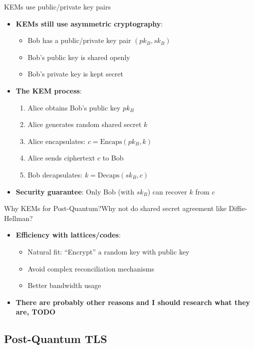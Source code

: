 \documentclass[aspectratio=169, lualatex, handout]{beamer}
\begin{document}
\begin{frame}{KEMs use public/private key pairs}
	\begin{itemize}
		\item \textbf{KEMs still use asymmetric cryptography}:
		      \begin{itemize}
			      \item Bob has a public/private key pair $(pk_B, sk_B)$
			      \item Bob's public key is shared openly
			      \item Bob's private key is kept secret
		      \end{itemize}
		\item \textbf{The KEM process}:
		      \begin{enumerate}
			      \item Alice obtains Bob's public key $pk_B$
			      \item Alice generates random shared secret $k$
			      \item Alice encapsulates: $c = \text{Encaps}(pk_B, k)$
			      \item Alice sends ciphertext $c$ to Bob
			      \item Bob decapsulates: $k = \text{Decaps}(sk_B, c)$
		      \end{enumerate}
		\item \textbf{Security guarantee}: Only Bob (with $sk_B$) can recover $k$ from $c$
	\end{itemize}
\end{frame}

\begin{frame}{Why KEMs for Post-Quantum?}{Why not do shared secret agreement like Diffie-Hellman?}
	\begin{itemize}
		\item \textbf{Efficiency with lattices/codes}:
		      \begin{itemize}
			      \item Natural fit: ``Encrypt'' a random key with public key
			      \item Avoid complex reconciliation mechanisms
			      \item Better bandwidth usage
		      \end{itemize}
		\item \textbf{There are probably other reasons and I should research what they are, TODO}
	\end{itemize}
\end{frame}

\subsection{Post-Quantum TLS}
\end{document}
